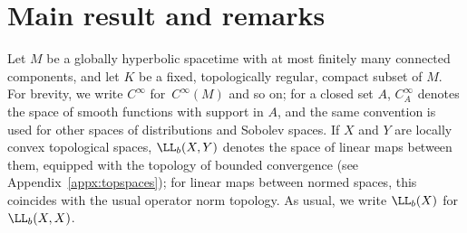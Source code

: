  \section{Main result and remarks}\label{sec:main}

 Let $M$ be a globally hyperbolic spacetime with at most finitely many connected components,
 and let $K$ be a fixed, topologically regular, compact subset of $M$. For brevity, we write $C^\infty$ for~$C^\infty(M)$ and so on; for a closed set $A$, $C^\infty_A$ denotes the space of smooth functions with support in $A$, and the same convention is used for other spaces of distributions and Sobolev spaces. If $X$ and $Y$ are locally convex topological spaces, $\LL_b(X,Y)$ denotes the space of linear maps between them, equipped with the topology of bounded convergence (see Appendix~\ref{appx:topspaces}); for linear maps between normed spaces, this coincides with the usual operator norm topology. As usual, we write $\LL_b(X)$ for $\LL_b(X,X)$.


